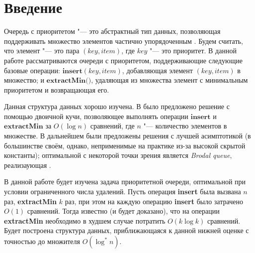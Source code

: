 \chapter*{Введение}							%


Очередь с приоритетом "--- это абстрактный тип данных, позволяющая поддерживать
множество элементов частично упорядоченным \cite{Cormen}. Будем считать, что элемент "---
это пара $(\textit{key}, \textit{item})$, где $key$ "--- это приоритет.
В данной работе рассматриваются очереди с приоритетом, поддерживающие следующие
базовые операции: $\textbf{insert}(key, item)$, добавляющая элемент $(key, item)$
в множество; и $\textbf{extractMin()}$, удаляющая
из множества элемент с минимальным приоритетом и возвращающая его.

Данная структура данных хорошо изучена. В  было предложено решение с помощью двоичной кучи, позволяющее выполнять
операции $\textbf{insert}$ и $\textbf{extractMin}$ за $O(\log n)$ сравнений, где $n$ "---
количество элементов в множестве. В дальнейшем были предложены решения с лучшей
асимптотикой (в большинстве своём, однако, неприменимые на практике из-за высокой
скрытой константы); оптимальной с некоторой точки зрения является 
\emph{Brodal queue}, реализаующая .

В данной работе будет изучена задача приоритетной очереди, оптимальной
при условии ограниченного числа удалений. Пусть операция \textbf{insert}
была вызвана $n$ раз, \textbf{extractMin} $k$ раз, при этом на каждую
операцию \textbf{insert} было затрачено $O(1)$ сравнений. Тогда известно
(и будет доказано), что на операции \textbf{extractMin} необходимо в худшем
случае потратить $O(k \log k)$ сравнений. Будет построена структура
данных, приближающаяся к данной нижней оценке с точностью до
множителя $O(\log^* n)$.



%
